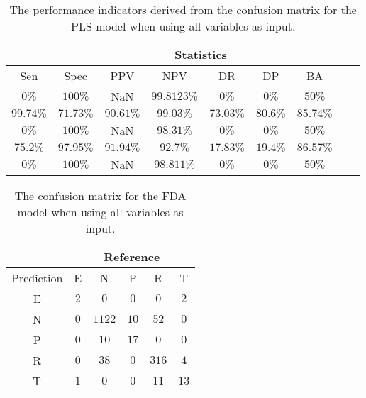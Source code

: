 \begin{table}[!ht]
	\centering
	\begin{tabular}{|c|c|c|c|c|c|c|c|c|}
		\hline
		 & \multicolumn{7}{c|}{Statistics} \\ \hline
		Sen & Spec & PPV & NPV & DR & DP & BA \\ \hline
		$0\%$ & $100\%$ & NaN & $99.8123\%$ & $0\%$ & $0\%$ & $50\%$ \\ \hline
		$99.74\%$ & $71.73\%$ & $90.61\%$ & $99.03\%$ & $73.03\%$ & $80.6\%$ & $85.74\%$ \\ \hline
		$0\%$ & $100\%$ & NaN & $98.31\%$ & $0\%$ & $0\%$ & $50\%$ \\ \hline
		$75.2\%$ & $97.95\%$ & $91.94\%$ & $92.7\%$ & $17.83\%$ & $19.4\%$ & $86.57\%$ \\ \hline
		$0\%$ & $100\%$ & NaN & $98.811\%$ & $0\%$ & $0\%$ & $50\%$ \\ \hline
	\end{tabular}
	\caption{The performance indicators derived from the confusion matrix for the PLS model when using all variables as input.}
	\label{tab:cs:all:pls}
\end{table}

\begin{table}[!ht]
	\centering
	\begin{tabular}{|c|c|c|c|c|c|}
		\hline
		 & \multicolumn{5}{|c|}{Reference} \\ \hline
		 Prediction & E & N & P & R & T \\ \hline
		 E & $2$ & $0$ & $0$ & $0$ & $2$ \\ \hline
		 N & $0$ & $1122$ & $10$ & $52$ & $0$ \\ \hline
		 P & $0$ & $10$ & $17$ & $0$ & $0$ \\ \hline
		 R & $0$ & $38$ & $0$ & $316$ & $4$ \\ \hline
		 T & $1$ & $0$ & $0$ & $11$ & $13$ \\ \hline
	\end{tabular}
	\caption{The confusion matrix for the FDA model when using all variables as input.}
	\label{tab:cm:all:fda}
\end{table}

